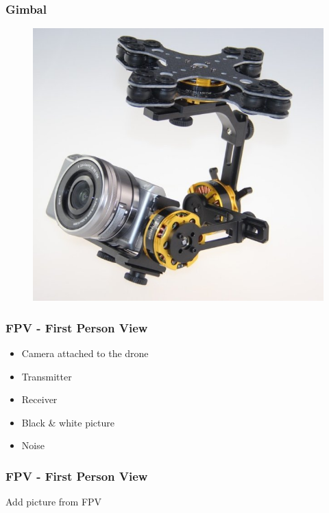 \begin{frame}
\frametitle{Gimbal}

  \begin{figure}
  \includegraphics[scale=0.4]{pic/03_our-copter/gimbal.jpg}
  \end{figure}
  
\end{frame}



\begin{frame}
\frametitle{FPV - First Person View}

  \begin{itemize}
  	\item Camera attached to the drone
    \item Transmitter    
    \item Receiver   
	\item Black \& white picture
	\item Noise 
  \end{itemize}
  
\end{frame}


\begin{frame}
\frametitle{FPV - First Person View}

	Add picture from FPV
  
\end{frame}


